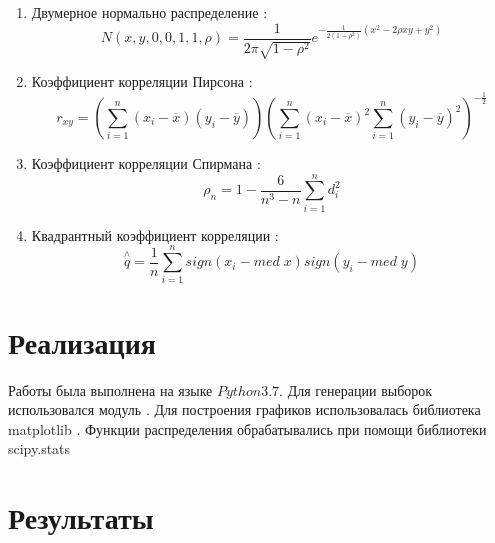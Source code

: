 \documentclass[12pt]{article}
\begin{document}
\begin{enumerate}
    \item Двумерное нормально распределение \cite{5_1}:
        \begin{equation}
        N(x,y,0,0,1,1,\rho) = \frac{1}{2\pi\sqrt{1-\rho^2}}e^{-\frac{1}{2(1-\rho^2)}(x^2-2\rho x y+y^2)} \label{dnd}
        \end{equation}
    
    \item Коэффициент корреляции Пирсона \cite{5_2}:
        \begin{equation}
        r_{xy} = \left(\sum\limits_{i=1}^n(x_i-\overline{x})(y_i-\overline{y})\right)\left(\sum\limits_{i=1}^n(x_i-\overline{x})^2\sum\limits_{i=1}^n(y_i-\overline{y})^2\right)^{-\frac{1}{2}} \label{ccp}
        \end{equation}
    \item Коэффициент корреляции Спирмана \cite{5_3}:
        \begin{equation}
        \rho_n = 1 -  \frac{6}{n^3-n}\sum\limits_{i=1}^n d_i^2\label{ccs}
        \end{equation}
        
    \item Квадрантный коэффициент корреляции \cite{5_4}:
        \begin{equation}
        \overset{\wedge}{q} = \frac{1}{n}\sum\limits_{i=1}^n sign(x_i-med\;x)sign(y_i-med\;y)\label{qcc}
        \end{equation}
\end{enumerate}

\section{Реализация}
Работы была выполнена на языке $Python 3.7.$
Для генерации выборок использовался модуль \cite{numpy}.
Для построения графиков использовалась библиотека matplotlib \cite{plotlib}.
Функции распределения обрабатывались при помощи библиотеки scipy.stats \cite{skp}

\section{Результаты}
\end{document}
